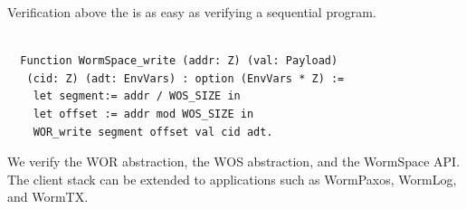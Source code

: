 

Verification above the \ghostlayer{} is as easy as verifying a sequential program.
\begin{lstlisting}[language=mycoq, basicstyle=\small]%, basicstyle=\linespread{0.5}]

  Function WormSpace_write (addr: Z) (val: Payload)
   (cid: Z) (adt: EnvVars) : option (EnvVars * Z) :=
    let segment:= addr / WOS_SIZE in 
    let offset := addr mod WOS_SIZE in
    WOR_write segment offset val cid adt.
\end{lstlisting}
\noindent We verify the WOR abstraction, the WOS abstraction, and the WormSpace API. The client stack can be extended to applications such as WormPaxos, WormLog, and WormTX. 





